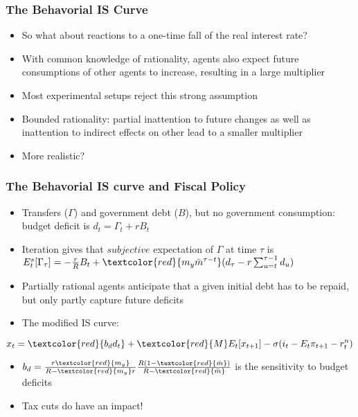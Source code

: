 \documentclass{beamer}
\begin{document}

\begin{frame}
\frametitle{The Behavorial IS Curve}
\begin{itemize}
\item So what about reactions to a one-time fall of the real interest rate?
\item With common knowledge of rationality, agents also expect future consumptions of other agents to increase, resulting in a large multiplier
\item Most experimental setups reject this strong assumption
\item Bounded rationality: partial inattention to future changes as well as inattention to indirect effects on other lead to a smaller multiplier
\item More realistic?
\end{itemize}
\end{frame}


\begin{frame}
\frametitle{The Behavorial IS curve and Fiscal Policy}
\begin{itemize}
\item Transfers ($\Gamma$) and government debt ($B$), but no government consumption: budget deficit is $d_ {t}=\Gamma_{t}+rB_{t}$
\item Iteration gives that $subjective$ expectation of $\Gamma$ at time $\tau$ is $E_{t}^{s}[\Gamma_{\tau}]=-\frac {r}{R}B_{t}+\textcolor{red}{m_{y}\bar m^{\tau-t}}(d_{\tau}-r \sum_{u=t}^{\tau-1}d_{u})$
\item Partially rational agents anticipate that a given initial debt has to be repaid, but only partly capture future deficits
\item The modified IS curve:

\end{itemize}
	$$x_{t}=\textcolor{red}{b_{d}d_{t}}+\textcolor{red}{M}E_{t}[x_{t+1}]-\sigma(i_{t}-E_{t}\pi_{t+1}-r_{t}^{n})$$
\begin{itemize}
 \item $b_{d}=\frac {r\textcolor{red}{m_{y}}}{R-\textcolor{red}{m_{y}}r}\frac {R(1-\textcolor{red}{\bar m})}{R-\textcolor{red}{\bar m}}$ is the sensitivity to budget deficits
 \item Tax cuts do have an impact!
\end{itemize}
\end{frame}
\end{document}
